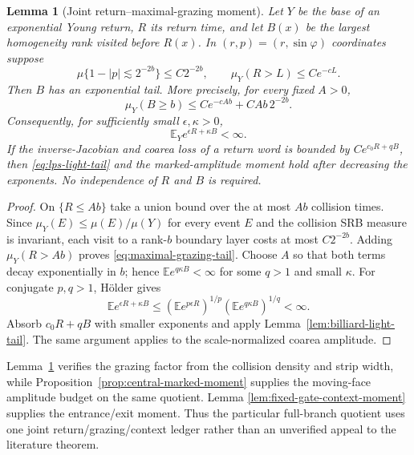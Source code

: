 \documentclass[11pt]{article}
\newtheorem{lemma}[theorem]{Lemma}
\begin{document}
\begin{lemma}[Joint return--maximal-grazing moment]
\label{lem:homogeneity-grazing-moment}
Let $Y$ be the base of an exponential Young return, $R$ its return time, and
let $B(x)$ be the largest homogeneity rank visited before $R(x)$.  In
$(r,p)=(r,\sin\varphi)$ coordinates suppose
\[
 \mu\{1-|p|\lesssim2^{-2b}\}\le C2^{-2b},
 \qquad \mu_Y(R>L)\le Ce^{-cL}.
\]
Then $B$ has an exponential tail.  More precisely, for every fixed $A>0$,
\begin{equation}
\label{eq:maximal-grazing-tail}
 \mu_Y(B\ge b)
 \le Ce^{-cAb}+CAb\,2^{-2b}.
\end{equation}
Consequently, for sufficiently small $\epsilon,\kappa>0$,
\begin{equation}
\label{eq:small-grazing-moment}
 \mathbb E_Y e^{\epsilon R+\kappa B}<\infty.
\end{equation}
If the inverse-Jacobian and coarea loss of a return word is bounded by
$Ce^{c_0R+qB}$, then \eqref{eq:lps-light-tail} and the marked-amplitude
moment hold after decreasing the exponents.  No independence of $R$ and $B$
is required.
\end{lemma}

\begin{proof}
On $\{R\le Ab\}$ take a union bound over the at most $Ab$ collision times.
Since $\mu_Y(E)\le\mu(E)/\mu(Y)$ for every event $E$ and the collision SRB
measure is invariant, each visit to a rank-$b$ boundary layer costs at most
$C2^{-2b}$.  Adding $\mu_Y(R>Ab)$ proves
\eqref{eq:maximal-grazing-tail}.  Choose $A$ so that both terms decay
exponentially in $b$; hence $\mathbb E e^{q\kappa B}<\infty$ for some
$q>1$ and small $\kappa$.  For conjugate $p,q>1$, H\"older gives
\[
 \mathbb E e^{\epsilon R+\kappa B}
 \le (\mathbb E e^{p\epsilon R})^{1/p}
      (\mathbb E e^{q\kappa B})^{1/q}<\infty.
\]
Absorb $c_0R+qB$ with smaller exponents and apply
Lemma~\ref{lem:billiard-light-tail}.  The same argument applies to the
scale-normalized coarea amplitude.
\end{proof}

Lemma~\ref{lem:homogeneity-grazing-moment} verifies the grazing factor from
the collision density and strip width, while
Proposition~\ref{prop:central-marked-moment} supplies the moving-face
amplitude budget on the same quotient.  Lemma
\ref{lem:fixed-gate-context-moment} supplies the entrance/exit moment.  Thus
the particular full-branch quotient uses one joint return/grazing/context
ledger rather than an unverified appeal to the literature theorem.
\end{document}

